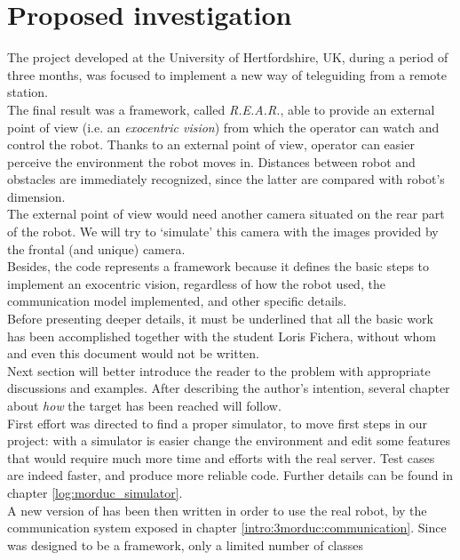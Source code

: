\section{Proposed investigation}
\label{intro:proposed_investigation}

The project developed at the University of Hertfordshire,
UK, during a period of three months, was focused to implement
a new way of teleguiding \morduc{} from a remote station.
\\
The final result was a framework, called \textit{R.E.A.R.},
able to provide an external point of view (i.e. an \textit{exocentric
vision}) from which the operator
can watch and control the robot.
Thanks to an external point of view, operator can easier
perceive the environment the robot moves in. Distances between
robot and obstacles are immediately recognized, since the latter
are compared with robot's dimension.
\\
The external point of view would need another camera situated
on the rear part of the robot. We will try to `simulate' this
camera with the images provided by the frontal (and unique)
camera.
\\
Besides, the code represents a framework because it defines the basic
steps to implement an exocentric vision, regardless of how the
robot used, the communication model implemented, and other
specific details.
\\
Before presenting deeper details, it must be underlined that
all the basic work has been accomplished together with the
student Loris Fichera, without whom \framework{} and even
this document would not be written.
\\
Next section will better introduce the reader to the problem with
appropriate discussions and examples. After describing
the author's intention, several chapter about \textit{how} the
target has been reached will follow.
\\
First effort was directed to find a proper \morduc{} simulator,
to move first steps in our project: with a simulator is easier
change the environment and edit some features that would require
much more time and efforts with the real server. Test cases are
indeed faster, and produce more reliable code. Further details
can be found in chapter \ref{log:morduc_simulator}.
\\
A new version of \framework{} has been then written in order
to use the real \morduc{} robot, by the communication system exposed
in chapter \ref{intro:3morduc:communication}. Since \framework{}
was designed to be a framework, only a limited number of classes
